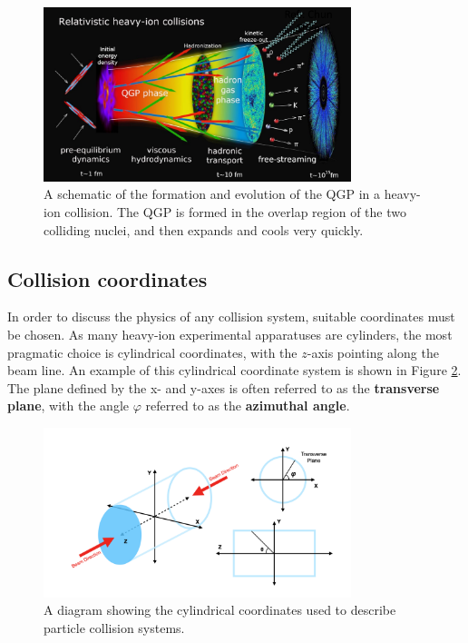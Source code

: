 \begin{figure}[ht!]
    \centering
    \includegraphics[width=0.8\textwidth]{figures/introduction/heavy_ion_phases.png}
    \caption{A schematic of the formation and evolution of the QGP in a heavy-ion collision. The QGP is formed in the overlap region of the two colliding nuclei, and then expands and cools very quickly.}
    \label{fig:qgp_evolution}
\end{figure}

\subsection{Collision coordinates}
In order to discuss the physics of any collision system, suitable coordinates must be chosen. As many heavy-ion experimental apparatuses are cylinders, the most pragmatic choice is cylindrical coordinates, with the $z$-axis pointing along the beam line. An example of this cylindrical coordinate system is shown in Figure \ref{fig:detector coordinates}. The plane defined by the x- and y-axes is often referred to as the \textbf{transverse plane}, with the angle $\varphi$ referred to as the \textbf{azimuthal angle}.

\begin{figure}
    \centering
    \includegraphics[width=0.8\textwidth]{figures/experiment/detector_coordinates.png}
    \caption{A diagram showing the cylindrical coordinates used to describe particle collision systems.}
    \label{fig:detector coordinates}
\end{figure}

